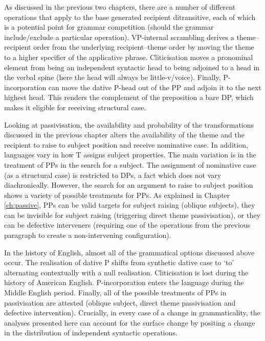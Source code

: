 	As discussed in the previous two chapters, there are a number of different operations that apply to the base generated recipient ditransitive, each of which is a potential point for grammar competition (should the grammar include/exclude a particular operation). VP-internal scrambling derives a theme--recipient order from the underlying recipient--theme order by moving the theme to a higher specifier of the applicative phrase. Cliticisation moves a pronominal element from being an independent syntactic head to being adjoined to a head in the verbal spine (here the head will always be little-v/voice). Finally, P-incorporation can move the dative P-head out of the PP and adjoin it to the next highest head. This renders the complement of the preposition a bare DP, which makes it eligible for receiving structural case.

	Looking at passivisation, the availability and probability of the transformations discussed in the previous chapter alters the availability of the theme and the recipient to raise to subject position and receive nominative case. In addition, languages vary in how T assigns subject properties. The main variation is in the treatment of PPs in the search for a subject. The assignment of nominative case (as a structural case) is restricted to DPs, a fact which does not vary diachronically. However, the search for an argument to raise to subject position shows a variety of possible treatments for PPs. As explained in Chapter \ref{ch:passive}, PPs can be valid targets for subject raising (oblique subjects), they can be invisible for subject raising (triggering direct theme passivisation), or they can be defective interveners (requiring one of the operations from the previous paragraph to create a non-intervening configuration).

	In the history of English, almost all of the grammatical options discussed above occur. The realisation of dative P shifts from synthetic dative case to `to' alternating contextually with a null realisation. Cliticisation is lost during the history of American English. P-incorporation enters the language during the Middle English period. Finally, all of the possible treatments of PPs in passivisation are attested (oblique subject, direct theme passivisation and defective intervention). Crucially, in every case of a change in grammaticality, the analyses presented here can account for the surface change by positing a change in the distribution of independent syntactic operations.


